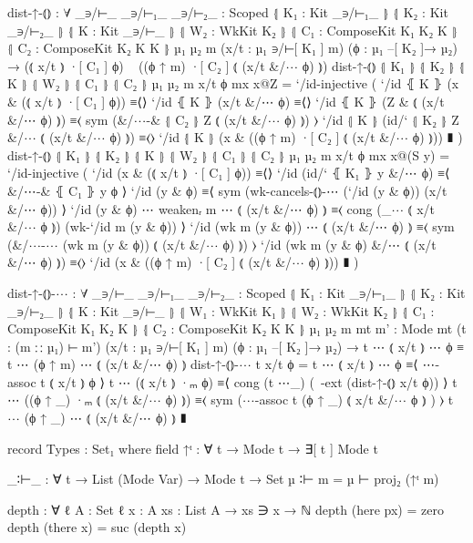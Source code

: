 \begin{code}
      dist-↑-⦅⦆ :
        ∀ {_∋/⊢_ _∋/⊢₁_ _∋/⊢₂_ : Scoped}
          ⦃ K₁ : Kit _∋/⊢₁_ ⦄ ⦃ K₂ : Kit _∋/⊢₂_ ⦄ ⦃ K : Kit _∋/⊢_ ⦄
          ⦃ W₂ : WkKit K₂ ⦄ ⦃ C₁ : ComposeKit K₁ K₂ K ⦄ ⦃ C₂ : ComposeKit K₂ K K ⦄
          {µ₁ µ₂ m} (x/t : µ₁ ∋/⊢[ K₁ ] m) (ϕ : µ₁ –[ K₂ ]→ µ₂) →
        (⦅ x/t ⦆ ·[ C₁ ] ϕ) ~ ((ϕ ↑ m) ·[ C₂ ] ⦅ (x/t &/⋯ ϕ) ⦆)
      dist-↑-⦅⦆ ⦃ K₁ ⦄ ⦃ K₂ ⦄ ⦃ K ⦄ ⦃ W₂ ⦄ ⦃ C₁ ⦄ ⦃ C₂ ⦄ {µ₁} {µ₂} {m} x/t ϕ mx x@Z = `/id-injective (
          `/id ⦃ K ⦄ (x & (⦅ x/t ⦆ ·[ C₁ ] ϕ))               ≡⟨⟩
          `/id ⦃ K ⦄ (x/t &/⋯ ϕ)                             ≡⟨⟩
          `/id ⦃ K ⦄ (Z & ⦅ (x/t &/⋯ ϕ) ⦆)                   ≡⟨ sym (&/⋯-& ⦃ C₂ ⦄ Z ⦅ (x/t &/⋯ ϕ) ⦆) ⟩
          `/id ⦃ K ⦄ (id/` ⦃ K₂ ⦄ Z &/⋯ ⦅ (x/t &/⋯ ϕ) ⦆)     ≡⟨⟩
          `/id ⦃ K ⦄ (x & ((ϕ ↑ m) ·[ C₂ ] ⦅ (x/t &/⋯ ϕ) ⦆)) ∎
        )
      dist-↑-⦅⦆ ⦃ K₁ ⦄ ⦃ K₂ ⦄ ⦃ K ⦄ ⦃ W₂ ⦄ ⦃ C₁ ⦄ ⦃ C₂ ⦄ {µ₁} {µ₂} {m} x/t ϕ mx x@(S y) = `/id-injective (
          `/id (x & (⦅ x/t ⦆ ·[ C₁ ] ϕ))               ≡⟨⟩
          `/id (id/` ⦃ K₁ ⦄ y &/⋯ ϕ)                   ≡⟨ &/⋯-& ⦃ C₁ ⦄ y ϕ ⟩
          `/id (y & ϕ)                                 ≡⟨ sym (wk-cancels-⦅⦆-⋯ (`/id (y & ϕ)) (x/t &/⋯ ϕ)) ⟩
          `/id (y & ϕ) ⋯ weakenᵣ m ⋯ ⦅ (x/t &/⋯ ϕ) ⦆   ≡⟨ cong (_⋯ ⦅ x/t &/⋯ ϕ ⦆) (wk-`/id m (y & ϕ)) ⟩
          `/id (wk m (y & ϕ)) ⋯ ⦅ (x/t &/⋯ ϕ) ⦆        ≡⟨ sym (&/⋯-⋯ (wk m (y & ϕ)) ⦅ (x/t &/⋯ ϕ) ⦆) ⟩
          `/id (wk m (y & ϕ) &/⋯ ⦅ (x/t &/⋯ ϕ) ⦆)      ≡⟨⟩
          `/id (x & ((ϕ ↑ m) ·[ C₂ ] ⦅ (x/t &/⋯ ϕ) ⦆)) ∎
        )

      dist-↑-⦅⦆-⋯ :
        ∀ {_∋/⊢_ _∋/⊢₁_ _∋/⊢₂_ : Scoped}
          ⦃ K₁ : Kit _∋/⊢₁_ ⦄ ⦃ K₂ : Kit _∋/⊢₂_ ⦄ ⦃ K : Kit _∋/⊢_ ⦄
          ⦃ W₁ : WkKit K₁ ⦄ ⦃ W₂ : WkKit K₂ ⦄ ⦃ C₁ : ComposeKit K₁ K₂ K ⦄ ⦃ C₂ : ComposeKit K₂ K K ⦄
          {µ₁ µ₂ m mt} {m' : Mode mt} (t : (m ∷ µ₁) ⊢ m')
          (x/t : µ₁ ∋/⊢[ K₁ ] m) (ϕ : µ₁ –[ K₂ ]→ µ₂) →
        t ⋯ ⦅ x/t ⦆ ⋯ ϕ ≡ t ⋯ (ϕ ↑ m) ⋯ ⦅ (x/t &/⋯ ϕ) ⦆
      dist-↑-⦅⦆-⋯ t x/t ϕ =
        t ⋯ ⦅ x/t ⦆ ⋯ ϕ                  ≡⟨ ⋯-assoc t ⦅ x/t ⦆ ϕ ⟩
        t ⋯ (⦅ x/t ⦆ ·ₘ ϕ)               ≡⟨ cong (t ⋯_) (~-ext (dist-↑-⦅⦆ x/t ϕ)) ⟩
        t ⋯ ((ϕ ↑ _) ·ₘ ⦅ (x/t &/⋯ ϕ) ⦆) ≡⟨ sym (⋯-assoc t (ϕ ↑ _) ⦅ x/t &/⋯ ϕ ⦆ ) ⟩
        t ⋯ (ϕ ↑ _) ⋯ ⦅ (x/t &/⋯ ϕ) ⦆    ∎

      record Types : Set₁ where
        field
          ↑ᵗ : ∀ {t} → Mode t → ∃[ t ] Mode t

        _∶⊢_ : ∀ {t} → List (Mode Var) → Mode t → Set
        µ ∶⊢ m = µ ⊢ proj₂ (↑ᵗ m)

        depth : ∀ {ℓ} {A : Set ℓ} {x : A} {xs : List A} → xs ∋ x → ℕ
        depth (here px) = zero
        depth (there x) = suc (depth x)


\end{code}
